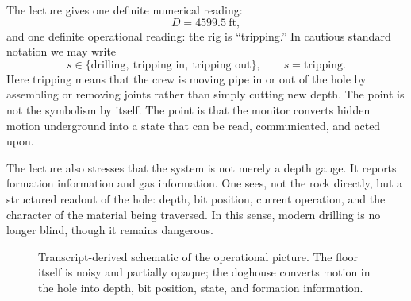 The lecture gives one definite numerical reading:
\begin{equation}
D = 4599.5\ \mathrm{ft},
\end{equation}
and one definite operational reading: the rig is ``tripping.'' In cautious standard notation we may write
\begin{equation}
s \in \{\text{drilling},\ \text{tripping in},\ \text{tripping out}\}, \qquad s=\text{tripping}.
\end{equation}
Here tripping means that the crew is moving pipe in or out of the hole by assembling or removing joints rather than simply cutting new depth. The point is not the symbolism by itself. The point is that the monitor converts hidden motion underground into a state that can be read, communicated, and acted upon.

The lecture also stresses that the system is not merely a depth gauge. It reports formation information and gas information. One sees, not the rock directly, but a structured readout of the hole: depth, bit position, current operation, and the character of the material being traversed. In this sense, modern drilling is no longer blind, though it remains dangerous.

\begin{figure}[h]
\centering
{}
\caption{Transcript-derived schematic of the operational picture. The floor itself is noisy and partially opaque; the doghouse converts motion in the hole into depth, bit position, state, and formation information.}
\end{figure}

